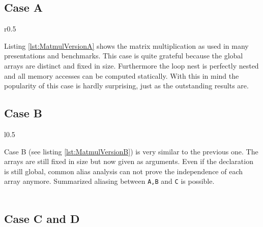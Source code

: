 \clearpage
\lstset{frame=none}
\subsection*{Case A}
\begin{wrapfigure}[]{r}{0.5\textwidth}
  \centering
    \hfill
    \hfill
    \begin{minipage}[c]{0.4\textwidth}
    \vspace*{-7mm}
    
    \end{minipage}
    \hfill
    \hfill
    \vspace*{-2mm}
  \caption{Matmul case A}
   \label{lst:MatmulVersionA}
\end{wrapfigure}

Listing \ref{lst:MatmulVersionA} shows the matrix multiplication as used in 
many presentations and benchmarks. This case is quite grateful because the
global arrays are distinct and fixed in size. Furthermore the loop nest is
perfectly nested and all memory accesses can be computed statically.
With this in mind the popularity of this case is hardly surprising,
just as the outstanding results are.\\


\subsection*{Case B}
\begin{wrapfigure}[]{l}{0.5\textwidth}
    \begin{minipage}[c]{0.4\textwidth}
    \vspace*{-7mm}
    
    \end{minipage}
    \hfill
    \hfill
    \vspace*{-2mm}
    \caption{Matmul case B}
    \label{lst:MatmulVersionB}
\end{wrapfigure}

Case B (see listing \ref{lst:MatmulVersionB}) is very similar to the previous one.
The arrays are still fixed in size but now given as arguments. Even if the
declaration is still global, common alias analysis can not prove the independence
of each array anymore. Summarized aliasing between \texttt{A,B} and \texttt{C} 
is possible.\\
~\\
\subsection*{Case C and D}

